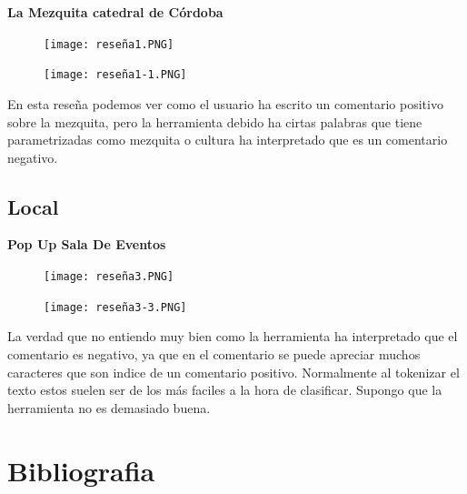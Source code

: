 \documentclass[12pt]{article}
\begin{document}
\textbf{La Mezquita catedral de Córdoba}

\begin{figure}[h!]
    \centering
    \texttt{[image: reseña1.PNG]}
    \label{fig:my_label}
\end{figure}

\begin{figure}[h!]
    \centering
    \texttt{[image: reseña1-1.PNG]}
    \label{fig:my_label}
\end{figure}



En esta reseña podemos ver como el usuario ha escrito un comentario positivo sobre la mezquita, pero la herramienta 
debido ha cirtas palabras que tiene parametrizadas como mezquita o cultura ha interpretado que es un comentario negativo.

\subsection{Local}

\textbf{Pop Up Sala De Eventos}

\begin{figure}[h!]
    \centering
    \texttt{[image: reseña3.PNG]}
    \label{fig:my_label}
\end{figure}

\clearpage

\begin{figure}[h!]
    \centering
    \texttt{[image: reseña3-3.PNG]}
    \label{fig:my_label}
\end{figure}

La verdad que no entiendo muy bien como la herramienta ha interpretado que el comentario es negativo, ya que en el comentario
se puede apreciar muchos caracteres que son indice de un comentario positivo. Normalmente al tokenizar el texto estos 
suelen ser de los más faciles a la hora de clasificar. Supongo que la herramienta no es demasiado buena.

\clearpage

\section{Bibliografia}

\cite{Estructuracion_de_datos}
\cite{Ejemplos_reales_del_Big_Data}
\cite{Data_Lake_vs_Data_Warehouse_kaits}
\cite{Data_Lake_vs_Data_Warehouse_bismart}
\cite{Tipos_de_análisis_de_datos}
\cite{Ejemplo_real_de_catastrofe}
\cite{relacion_big_data_y_business_intelligence}
\cite{relacion_big_data_y_business_intelligence_2}
\cite{requisitos_para_ser_cientifico_de_datos}

\printbibliography
\end{document}

